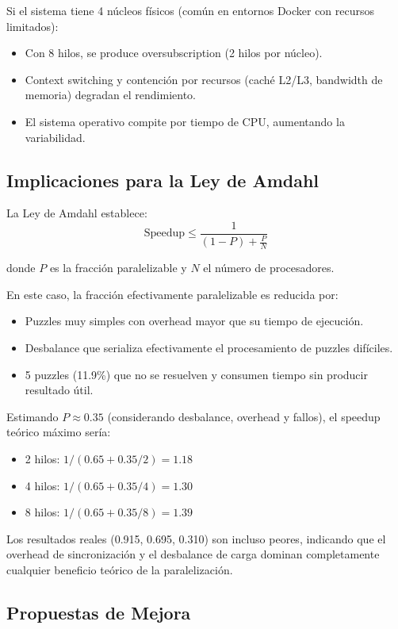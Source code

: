 \documentclass[12pt,a4paper]{article}
\begin{document}
Si el sistema tiene 4 núcleos físicos (común en entornos Docker con recursos limitados):
\begin{itemize}
    \item Con 8 hilos, se produce oversubscription (2 hilos por núcleo).
    \item Context switching y contención por recursos (caché L2/L3, bandwidth de memoria) degradan el rendimiento.
    \item El sistema operativo compite por tiempo de CPU, aumentando la variabilidad.
\end{itemize}

\subsection{Implicaciones para la Ley de Amdahl}

La Ley de Amdahl establece:
\begin{equation}
\text{Speedup} \leq \frac{1}{(1-P) + \frac{P}{N}}
\end{equation}

donde $P$ es la fracción paralelizable y $N$ el número de procesadores.

En este caso, la fracción efectivamente paralelizable es reducida por:
\begin{itemize}
    \item Puzzles muy simples con overhead mayor que su tiempo de ejecución.
    \item Desbalance que serializa efectivamente el procesamiento de puzzles difíciles.
    \item 5 puzzles (11.9\%) que no se resuelven y consumen tiempo sin producir resultado útil.
\end{itemize}

Estimando $P \approx 0.35$ (considerando desbalance, overhead y fallos), el speedup teórico máximo sería:
\begin{itemize}
    \item 2 hilos: $1/(0.65 + 0.35/2) = 1.18$
    \item 4 hilos: $1/(0.65 + 0.35/4) = 1.30$
    \item 8 hilos: $1/(0.65 + 0.35/8) = 1.39$
\end{itemize}

Los resultados reales (0.915, 0.695, 0.310) son incluso peores, indicando que el overhead de sincronización y el desbalance de carga dominan completamente cualquier beneficio teórico de la paralelización.

\subsection{Propuestas de Mejora}
\end{document}

